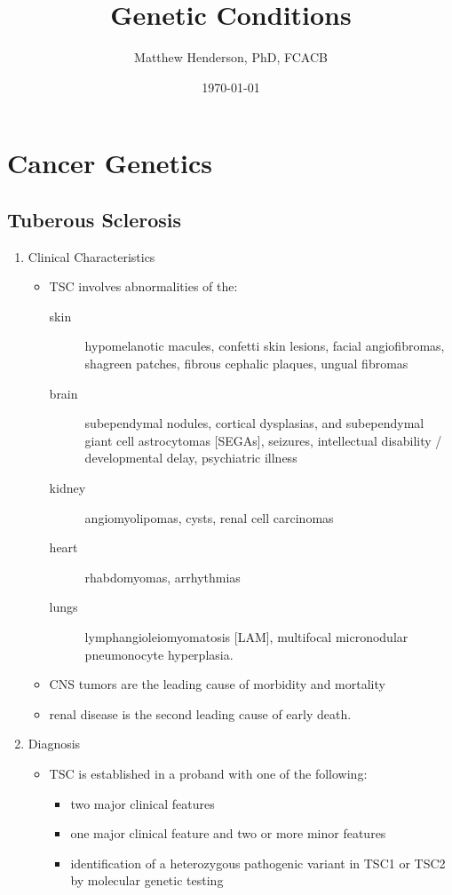 \documentclass[12pt]{scrartcl}
\author{Matthew Henderson, PhD, FCACB}
\date{\today}
\title{Genetic Conditions}
\begin{document}
\maketitle
\setcounter{tocdepth}{2}
\tableofcontents


\section{Cancer Genetics}
\label{sec:orge22fd4f}
\subsection{Tuberous Sclerosis}
\label{sec:orgf73ad37}
\begin{enumerate}
\item Clinical Characteristics
\label{sec:org9d7332e}
\begin{itemize}
\item TSC involves abnormalities of the:
\begin{description}
\item[{skin}] hypomelanotic macules, confetti skin lesions, facial
angiofibromas, shagreen patches, fibrous cephalic plaques,
ungual fibromas
\item[{brain}] subependymal nodules, cortical dysplasias, and
subependymal giant cell astrocytomas [SEGAs], seizures,
intellectual disability / developmental delay,
psychiatric illness
\item[{kidney}] angiomyolipomas, cysts, renal cell carcinomas
\item[{heart}] rhabdomyomas, arrhythmias
\item[{lungs}] lymphangioleiomyomatosis [LAM], multifocal micronodular
pneumonocyte hyperplasia.
\end{description}
\item CNS tumors are the leading cause of morbidity and mortality
\item renal disease is the second leading cause of early death.
\end{itemize}

\item Diagnosis
\label{sec:orgdeafa18}
\begin{itemize}
\item TSC is established in a proband with one of the following:
\begin{itemize}
\item two major clinical features
\item one major clinical feature and two or more minor features
\item identification of a heterozygous pathogenic variant in TSC1 or
TSC2 by molecular genetic testing
\end{itemize}
\end{itemize}


\end{enumerate}
\end{document}
